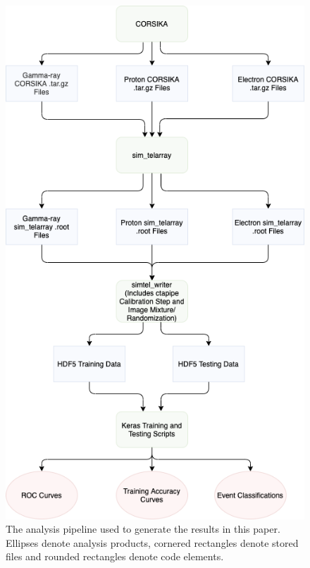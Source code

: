 \begin{figure}
  \centering
  \includegraphics[width=0.7
  \textwidth]{figures/waveformstructure.png}
  \caption{The analysis pipeline used to generate the results in this paper. Ellipses denote analysis products, cornered rectangles denote stored files and rounded rectangles denote code elements.
  }
  \label{fig:wavelearn}
\end{figure}

